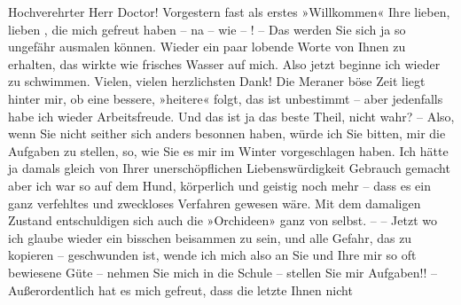 \pstart{}Hochverehrter Herr Doctor!\pend\vspace{0.5em}
\pstart
           Vorgestern fast als erstes »Willkommen« Ihre lieben, lieben \label{K_L03713-1v}\label{K_L03713-1}, die mich gefreut haben – na – wie –
               ! – Das werden Sie sich ja so ungefähr ausmalen können. Wieder ein paar lobende Worte
               von Ihnen zu erhalten, das wirkte wie frisches Wasser auf mich. Also jetzt beginne
               ich wieder zu schwimmen. Vielen, vielen herzlichsten Dank! Die Meraner böse Zeit liegt hinter mir, ob eine bessere,
               »heitere« folgt, das ist unbestimmt – aber jedenfalls habe ich wieder Arbeitsfreude.
               Und das ist ja {\pb}das beste Theil, nicht wahr? – Also, wenn Sie nicht
               seither sich anders besonnen haben, würde ich Sie bitten, mir die Aufgaben zu
               stellen, so, wie Sie es mir im Winter vorgeschlagen haben. Ich hätte ja
               damals gleich von Ihrer unerschöpflichen Liebenswürdigkeit Gebrauch gemacht aber ich
               war so auf dem Hund, körperlich und geistig noch mehr – dass es ein ganz verfehltes
               und zweckloses Verfahren gewesen wäre. Mit dem damaligen Zustand entschuldigen sich
               auch die »Orchideen» ganz von selbst. – – Jetzt
               wo ich glaube wieder ein bisschen beisammen zu sein, und alle Gefahr, das \label{K_L03713-2v}\label{K_L03713-2} zu kopieren – geschwunden ist, wende ich mich also an Sie und Ihre
               mir so oft bewiesene Güte – nehmen Sie mich in die Schule – stellen Sie mir
               Aufgaben!! – Außerordentlich hat es mich gefreut, dass {\pb}die letzte \label{K_L03713-3v}\label{K_L03713-3} Ihnen nicht
